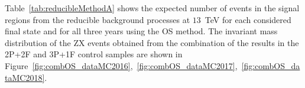 Table~\ref{tab:reducibleMethodA} shows the expected number of
events in the signal regions from the reducible background processes at $13$~TeV for each considered final state and for all three years using the OS method.
The invariant mass distribution of the ZX events obtained from the combination of the results in the 2P+2F and 3P+1F control samples
are shown in Figure~\ref{fig:combOS_dataMC2016},~\ref{fig:combOS_dataMC2017},~\ref{fig:combOS_dataMC2018}.
\begin{figure}[!htb]
\begin{center}
          \\
         \\       

\end{center}
\end{figure}
